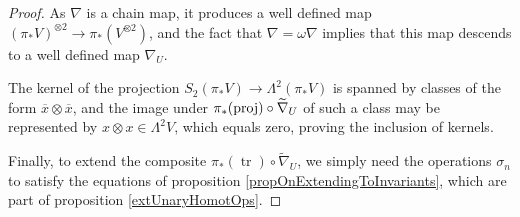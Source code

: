 \documentclass[11pt]{amsart}
\theoremstyle{plain}
\theoremstyle{definition}
\DeclareMathOperator{\trace}{tr}
\newcommand{\DASH}{\textup{--}}
\renewcommand{\to}{\longrightarrow}
\newcommand{\calV}{\mathcal{V}}
\theoremstyle{plain}
\newcommand{\restn}[1]{#1^{[2]}}
\newcommand{\vect}[2]{\calV^{#1}_{#2}}
\newcommand{\twist}{\omega}
\newcommand{\Nabla}{\nabla}
\begin{document}
\begin{Constructing (co)homotopy operations}
\begin{proof}
As $\nabla$ is a chain  map, it produces a well defined map $(\pi_*V)^{\otimes2}\to \pi_*(V^{\otimes2})$, and the fact that $\nabla=\twist\nabla$ implies that this map descends to a well defined map $\nabla_U$.

The kernel of the projection $S_2(\pi_*V)\to \Lambda^2(\pi_*V)$ is spanned by classes of the form $\overline{x}\otimes \overline{x}$, and the image under $\pi_*(\textup{proj})\circ\widetilde{\nabla}_U$ of such a class may be represented by $x\otimes x\in \Lambda^2V$, which equals zero, proving the inclusion of kernels.

Finally, to extend the composite $\pi_*(\trace)\circ\widetilde{\nabla}_U$, we simply need the operations $\sigma_n$ to satisfy the equations of proposition \ref{propOnExtendingToInvariants}, which are part of proposition \ref{extUnaryHomotOps}.
%
%
%
%
%
\end{proof}


\end{Constructing (co)homotopy operations}
\end{document}
